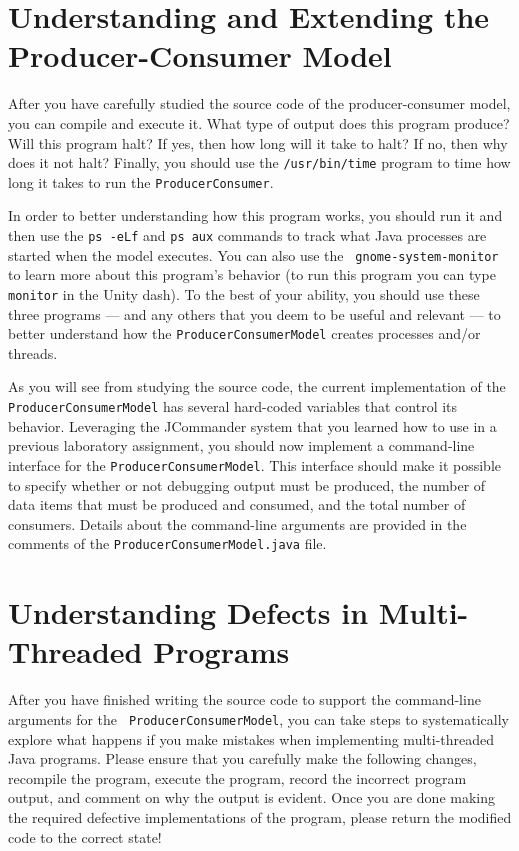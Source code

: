 \section*{Understanding and Extending the Producer-Consumer Model}

After you have carefully studied the source code of the producer-consumer model, you can compile and execute it.  What
type of output does this program produce?  Will this program halt?  If yes, then how long will it take to halt?  If no,
then why does it not halt?  Finally, you should use the {\tt /usr/bin/time} program to time how long it takes to run the
{\tt ProducerConsumer}.

In order to better understanding how this program works, you should run it and then use the {\tt ps -eLf} and {\tt ps
  aux} commands to track what Java processes are started when the model executes. You can also use the {\tt
  gnome-system-monitor} to learn more about this program's behavior (to run this program you can type {\tt monitor} in
the Unity dash).  To the best of your ability, you should use these three programs --- and any others that you deem to
be useful and relevant --- to better understand how the {\tt ProducerConsumerModel} creates processes and/or threads.

\begin{sloppypar} As you will see from studying the source code, the current implementation of the {\tt
    ProducerConsumerModel} has several hard-coded variables that control its behavior. Leveraging the JCommander system
  that you learned how to use in a previous laboratory assignment, you should now implement a command-line interface for
  the {\tt ProducerConsumerModel}.  This interface should make it possible to specify whether or not debugging output
  must be produced, the number of data items that must be produced and consumed, and the total number of consumers.
  Details about the command-line arguments are provided in the comments of the {\tt ProducerConsumerModel.java} file.
\end{sloppypar}

\section*{Understanding Defects in Multi-Threaded Programs}

After you have finished writing the source code to support the command-line arguments for the {\tt
  ProducerConsumerModel}, you can take steps to systematically explore what happens if you make mistakes when
implementing multi-threaded Java programs.  Please ensure that you carefully make the following changes, recompile the
program, execute the program, record the incorrect program output, and comment on why the output is evident.  Once you
are done making the required defective implementations of the program, please return the modified code to the correct
state!


